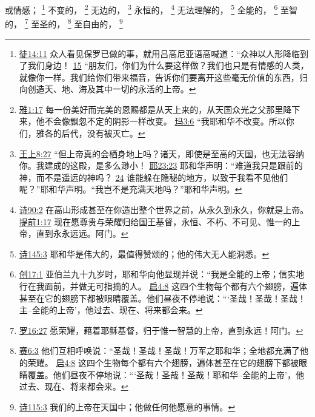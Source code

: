 \documentclass[12pt, a4paper, oneside]{ctexart}
\begin{document}
	或情感；
	\footnote {
		\href{https://biblehub.com/acts/14-11.htm}{徒14:11} 众人看见保罗已做的事，就用吕高尼亚语高喊道：“众神以人形降临到了我们身边！
		\href{https://biblehub.com/acts/14-15.htm}{15} “朋友们，你们为什么要这样做？我们也只是有情感的人类，就像你一样。我们给你们带来福音，告诉你们要离开这些毫无价值的东西，归向创造天、地、海及其中一切的永活的上帝。
	}
	不变的，
	\footnote {
		\href{https://biblehub.com/james/1-17.htm}{雅1:17} 每一份美好而完美的恩赐都是从天上来的，从天国众光之父那里降下来，他不会像飘忽不定的阴影一样改变。
		\href{https://biblehub.com/malachi/3-6.htm}{玛3:6} “我耶和华不改变。所以你们，雅各的后代，没有被灭亡。
	}
	无边的，
	\footnote {
		\href{https://biblehub.com/1_kings/8-27.htm}{王上8:27} “但上帝真的会栖身地上吗？诸天，即使是至高的天国，也无法容纳你。我建成的这殿，是多么渺小！
		\href{https://biblehub.com/jeremiah/23-23.htm}{耶23:23} 耶和华声明：“难道我只是跟前的神，而不是遥远的神吗？
		\href{https://biblehub.com/jeremiah/23-24.htm}{24} 谁能躲在隐秘的地方，以致于我看不见他们呢？”耶和华声明。“我岂不是充满天地吗？”耶和华声明。
	}
	永恒的，
	\footnote {
		\href{https://biblehub.com/psalms/90-2.htm}{诗90:2} 在高山形成甚至在你造出整个世界之前，从永久到永久，你就是上帝。
		\href{https://biblehub.com/1_timothy/1-17.htm}{提前1:17} 现在愿尊贵与荣耀归给国王基督，永恒、不朽、不可见、惟一的上帝，直到永永远远。阿门。
	}
	无法理解的，
	\footnote {
		\href{https://biblehub.com/psalms/145-3.htm}{诗145:3} 耶和华是伟大的，最值得赞颂的；他的伟大无人能洞悉。
	}
	全能的，
	\footnote {
		\href{https://biblehub.com/genesis/17-1.htm}{创17:1} 亚伯兰九十九岁时，耶和华向他显现并说：“我是全能的上帝；信实地行在我面前，并做无可指摘的人。
		\href{https://biblehub.com/revelation/4-8.htm}{启4:8} 这四个生物每个都有六个翅膀，遍体甚至在它的翅膀下都被眼睛覆盖。他们昼夜不停地说：“‘圣哉！圣哉！圣哉！主--全能的上帝’，他过去、现在、将来都会来。
	}
	至智的，
	\footnote {
		\href{https://biblehub.com/romans/16-27.htm}{罗16:27} 愿荣耀，藉着耶稣基督，归于惟一智慧的上帝，直到永远！阿门。
	}
	至圣的，
	\footnote {
		\href{https://biblehub.com/isaiah/6-3.htm}{赛6:3} 他们互相呼唤说：“圣哉！圣哉！圣哉！万军之耶和华；全地都充满了他的荣耀。
		\href{https://biblehub.com/revelation/4-8.htm}{启4:8} 这四个生物每个都有六个翅膀，遍体甚至在它的翅膀下都被眼睛覆盖。他们昼夜不停地说：“‘圣哉！圣哉！圣哉！耶和华--全能的上帝’，他过去、现在、将来都会来。
	}
	至自由的，
	\footnote {
		\href{https://biblehub.com/psalms/115-3.htm}{诗115:3} 我们的上帝在天国中；他做任何他愿意的事情。
	}
\end{document}

